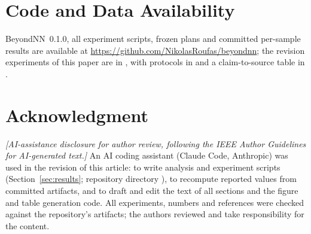 \section*{Code and Data Availability}
BeyondNN~0.1.0, all experiment scripts, frozen plans and committed per-sample results are available at \url{https://github.com/NikolasRoufas/beyondnn}; the revision experiments of this paper are in , with protocols in  and a claim-to-source table in .

\section*{Acknowledgment}
\emph{[AI-assistance disclosure for author review, following the IEEE Author Guidelines for AI-generated text.]} An AI coding assistant (Claude Code, Anthropic) was used in the revision of this article: to write analysis and experiment scripts (Section~\ref{sec:results}; repository directory ), to recompute reported values from committed artifacts, and to draft and edit the text of all sections and the figure and table generation code. All experiments, numbers and references were checked against the repository's artifacts; the authors reviewed and take responsibility for the content.
